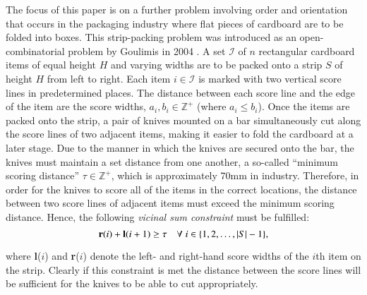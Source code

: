 \documentclass{elsarticle}
\begin{document}
The focus of this paper is on a further problem involving order and orientation that occurs in the packaging industry where flat pieces of cardboard are to be folded into boxes. This strip-packing problem was introduced as an open-combinatorial problem by Goulimis in 2004 \cite{goulimis2004}. A set $\mathcal{I}$ of $n$ rectangular cardboard items of equal height $H$ and varying widths are to be packed onto a strip $S$ of height $H$ from left to right. Each item $i \in \mathcal{I}$ is marked with two vertical score lines in predetermined places. The distance between each score line and the edge of the item are the score widths, $a_i, b_i \in \mathbb{Z}^+$ (where $a_i \leq b_i$). Once the items are packed onto the strip, a pair of knives mounted on a bar simultaneously cut along the score lines of two adjacent items, making it easier to fold the cardboard at a later stage. Due to the manner in which the knives are secured onto the bar, the knives must maintain a set distance from one another, a so-called ``minimum scoring distance'' $\tau \in \mathbb{Z}^+$, which is approximately 70mm in industry. Therefore, in order for the knives to score all of the items in the correct locations, the distance between two score lines of adjacent items must exceed the minimum scoring distance. Hence, the following \emph{vicinal sum constraint} must be fulfilled:
\begin{equation}
	\label{eqn:vsc}
	\textbf{r}(i) + \textbf{l}(i+1) \geq \tau \quad \forall \hspace{1mm} i \in \{1,2,\dotsc,|S|- 1\},
\end{equation}

\noindent where \textbf{l}($i$) and \textbf{r}($i$) denote the left- and right-hand score widths of the $i$th item on the strip. Clearly if this constraint is met the distance between the score lines will be sufficient for the knives to be able to cut appropriately.
\end{document}
